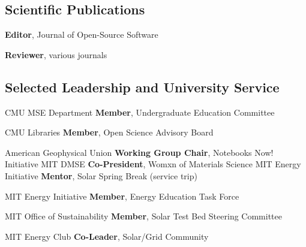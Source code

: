 \subsection{Scientific Publications}
{}
{\textbf{Editor}, Journal of Open-Source Software}
{}

                      {}
                      {\textbf{Reviewer}, various journals}
                      {}

\vspace{-2mm}
\subsection{Selected Leadership and University Service}
                      {CMU MSE Department}
                      {\textbf{Member}, Undergraduate Education Committee}
                      {}

                      {CMU Libraries}
                      {\textbf{Member}, Open Science Advisory Board}
                      {}

{American Geophysical Union}
{\textbf{Working Group Chair}, Notebooks Now! Initiative}
{}
{MIT DMSE}
{\textbf{Co-President}, Womxn of Materials Science}
{}
{MIT Energy Initiative}
{\textbf{Mentor}, Solar Spring Break (service trip)}
{}

{MIT Energy Initiative}
{\textbf{Member}, Energy Education Task Force}
{}

{MIT Office of Sustainability}
{\textbf{Member}, Solar Test Bed Steering Committee}
{}

{MIT Energy Club}
{\textbf{Co-Leader}, Solar/Grid Community}
{}
